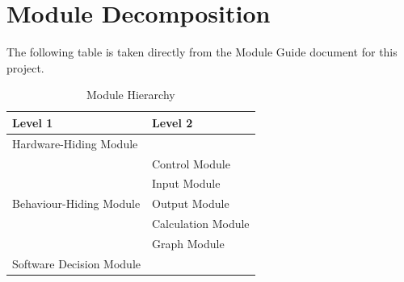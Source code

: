 \documentclass[12pt, titlepage]{article}
\begin{document}
\newpage
\section{Module Decomposition}

The following table is taken directly from the Module Guide document for this project.

\begin{table}[h!]
\centering
\begin{tabular}{p{} p{}}
\toprule
\textbf{Level 1} & \textbf{Level 2}\\
\midrule

{Hardware-Hiding Module} & ~ \\
\midrule

\multirow{5}{0.3\textwidth}{Behaviour-Hiding Module} 
& Control Module\\
& Input Module\\
& Output Module\\
& Calculation Module\\
& Graph Module\\
\midrule

\multirow{1}{0.3\textwidth}{Software Decision Module} 
& \\
\bottomrule

\end{tabular}
\caption{Module Hierarchy}
\label{TblMH}
\end{table}
\end{document}
